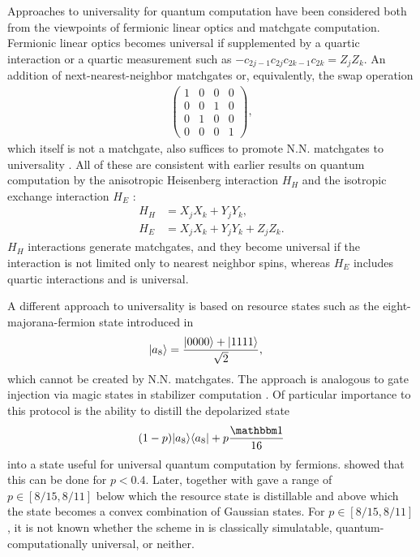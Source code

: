Approaches to universality for quantum computation have been considered both from the viewpoints of fermionic linear optics and matchgate computation. Fermionic linear optics becomes universal if supplemented by a quartic interaction \cite{bravyi_fermionic_2002} or a quartic measurement \cite{bravyi_fermionic_2002,beenakker_charge_2004} such as $-c_{2j-1}c_{2j}c_{2k-1}c_{2k} = Z_jZ_k$. An addition of next-nearest-neighbor matchgates or, equivalently, the swap operation
\begin{align}
	\begin{pmatrix}
		1 & 0 & 0 & 0 \\
		0 & 0 & 1 & 0 \\
		0 & 1 & 0 & 0 \\
		0 & 0 & 0 & 1
	\end{pmatrix},
\end{align}
which itself is not a matchgate, also suffices to promote N.N. matchgates to universality \cite{jozsa_matchgates_2008}. All of these are consistent with earlier results on quantum computation by the anisotropic Heisenberg interaction $H_H$ and the isotropic exchange interaction $H_E$ \cite{divincenzo_universal_2000,kempe_encoded_2001,kempe_exact_2002}:
\begin{align}
	H_H &= X_jX_k + Y_jY_k, \\
	H_E &= X_jX_k + Y_jY_k + Z_jZ_k.
\end{align}
$H_H$ interactions generate matchgates, and they become universal if the interaction is not limited only to nearest neighbor spins, whereas $H_E$ includes quartic interactions and is universal.

A different approach to universality is based on resource states such as the eight-majorana-fermion state introduced in \cite{bravyi_universal_2006}
\begin{align}
	{\left\vert{a_8}\right\rangle} &= \frac{{\left\vert{0000}\right\rangle}+{\left\vert{1111}\right\rangle}}{\sqrt{2}},
\end{align}
which cannot be created by N.N. matchgates. The approach is analogous to gate injection via magic states in stabilizer computation \cite{bravyi_universal_2005}. Of particular importance to this protocol is the ability to distill the depolarized state
\begin{align}
	(1-p)\ketbra{a_8}{a_8} + p\frac{\id}{16}
\end{align}
into a state useful for universal quantum computation by fermions. \cite{bravyi_universal_2006} showed that this can be done for $p<0.4$. Later, \cite{melo_power_2013} together with \cite{oszmaniec_classical_2014} gave a range of $p \in \left[ 8/15, 8/11 \right]$ below which the resource state is distillable and above which the state becomes a convex combination of Gaussian states. For $p \in \left[ 8/15, 8/11 \right]$, it is not known whether the scheme in \cite{bravyi_universal_2006} is classically simulatable, quantum-computationally universal, or neither.


